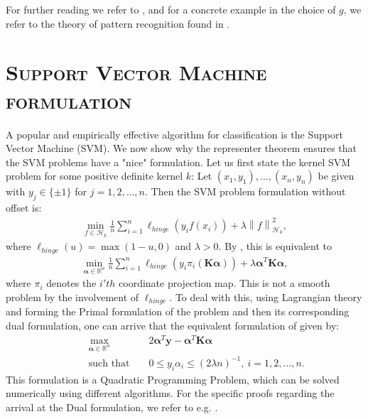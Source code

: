 \documentclass[10pt,twoside,openany,final]{memoir}
\newcommand{\sssection}[1]{%
\section[#1]{\centering\normalfont\scshape \textbf{#1}}}
\theoremstyle{definition}
\theoremstyle{Break}
\newcommand{\lv}{\left\lVert}
\newcommand{\rv}{\right\rVert}
\newcommand{\R}{\mathbb{R}}
\renewcommand{\H}{\mathcal{H}}
\begin{document}
For further reading we refer to \cite{genbd}, and for a concrete example in the choice of $g$, we refer to the theory of pattern recognition found in \cite{vapnik}.
\sssection{Support Vector Machine formulation}
A popular and empirically effective algorithm for classification is the Support Vector Machine (SVM). We now show why the representer theorem ensures that the SVM problems have a "nice" formulation. Let us first state the kernel SVM problem for some positive definite kernel $k$: Let $(x_1,y_1),\dots,(x_n,y_n)$ be given with $y_j \in \{ \pm 1 \}$ for $j = 1,2,\dots,n$. Then the SVM problem formulation without offset is:
\begin{align}
	\min_{f \in \H_k} \frac{1}{n} \sum_{i=1}^n \ell_{hinge}(y_i f(x_i)) + \lambda \lv f \rv_{\H_k}^2, \label{svmform1}
\end{align}
where $\ell_{hinge}(u) = \max(1-u,0)$ and $\lambda >0$. By , this is equivalent to
\begin{align*}
	\min_{\pmb \alpha \in \R^n}  \frac{1}{n} \sum_{i=1}^n \ell_{hinge}(y_i \pi_i(\textbf{K} \pmb \alpha))+ \lambda \pmb \alpha^T \textbf{K} \pmb \alpha,
\end{align*}
where $\pi_i$ denotes the $i'th$ coordinate projection map. This is not a smooth problem by the involvement of $\ell_{hinge}$. To deal with this, using Lagrangian theory and forming the Primal formulation of the problem and then its corresponding dual formulation, one can arrive that the equivalent formulation of  given by:
\begin{align*}
&&	&\max_{\pmb \alpha \in \R^n} &  &2 \pmb \alpha^T \pmb y - \pmb \alpha^T \pmb K \pmb \alpha\\
&&	&\text{such that } & &0 \leq y_i \alpha_i \leq (2 \lambda n)^{-1}, \ i = 1,2,\dots,n.
\end{align*}
This formulation is a Quadratic Programming Problem, which can be solved numerically using different algorithms. For the specific proofs regarding the arrival at the Dual formulation, we refer to e.g. \cite{smola}.
\printbibliography
\end{document}
